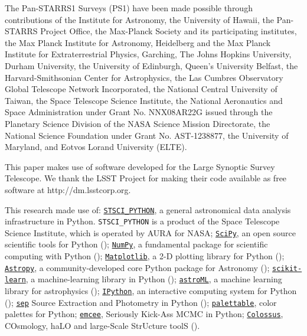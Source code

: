 \documentclass[a4paper,fleqn,usenatbib]{mnras}
\begin{document}
  The Pan-STARRS1 Surveys (PS1) have been made possible through contributions of the 
  Institute for Astronomy, the University of Hawaii, the Pan-STARRS Project Office, 
  the Max-Planck Society and its participating institutes, the Max Planck Institute 
  for Astronomy, Heidelberg and the Max Planck Institute for Extraterrestrial Physics, 
  Garching, The Johns Hopkins University, Durham University, the University of Edinburgh, 
  Queen's University Belfast, the Harvard-Smithsonian Center for Astrophysics, the Las 
  Cumbres Observatory Global Telescope Network Incorporated, the National Central 
  University of Taiwan, the Space Telescope Science Institute, the National Aeronautics 
  and Space Administration under Grant No. NNX08AR22G issued through the Planetary 
  Science Division of the NASA Science Mission Directorate, the National Science 
  Foundation under Grant No. AST-1238877, the University of Maryland, and Eotvos 
  Lorand University (ELTE).
  
  This paper makes use of software developed for the Large Synoptic Survey 
  Telescope. We thank the LSST Project for making their code available as free 
  software at http://dm.lsstcorp.org.
 
  This research made use of:
  \href{http://www.stsci.edu/institute/software_hardware/pyraf/stsci\_python}{\texttt{STSCI\_PYTHON}},
      a general astronomical data analysis infrastructure in Python. 
      \texttt{STSCI\_PYTHON} is a product of the Space Telescope Science Institute, 
      which is operated by AURA for NASA;
  \href{http://www.scipy.org/}{\texttt{SciPy}},
      an open source scientific tools for Python (\citealt{SciPy});
  \href{http://www.numpy.org/}{\texttt{NumPy}}, 
      a fundamental package for scientific computing with Python (\citealt{NumPy});
  \href{http://matplotlib.org/}{\texttt{Matplotlib}}, 
      a 2-D plotting library for Python (\citealt{Matplotlib});
  \href{http://www.astropy.org/}{\texttt{Astropy}}, a community-developed 
      core Python package for Astronomy (\citealt{AstroPy}); 
  \href{http://scikit-learn.org/stable/index.html}{\texttt{scikit-learn}},
      a machine-learning library in Python (\citealt{scikit-learn}); 
  \href{http://www.astroml.org/}{\texttt{astroML}}, 
      a machine learning library for astrophysics (\citealt{astroML});
  \href{https://ipython.org}{\texttt{IPython}}, 
      an interactive computing system for Python (\citealt{IPython});
  \href{https://github.com/kbarbary/sep}{\texttt{sep}} 
      Source Extraction and Photometry in Python (\citealt{PythonSEP});
  \href{https://jiffyclub.github.io/palettable/}{\texttt{palettable}},
      color palettes for Python;
  \href{http://dan.iel.fm/emcee/current/}{\texttt{emcee}}, 
      Seriously Kick-Ass MCMC in Python;
  \href{http://bdiemer.bitbucket.org/}{\texttt{Colossus}}, 
      COsmology, haLO and large-Scale StrUcture toolS (\citealt{Colossus}).
\end{document}
